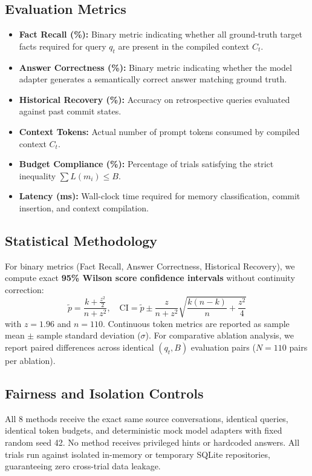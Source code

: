 \subsection{Evaluation Metrics}
\begin{itemize}
    \item \textbf{Fact Recall (\%):} Binary metric indicating whether all ground-truth target facts required for query $q_t$ are present in the compiled context $C_t$.
    \item \textbf{Answer Correctness (\%):} Binary metric indicating whether the model adapter generates a semantically correct answer matching ground truth.
    \item \textbf{Historical Recovery (\%):} Accuracy on retrospective queries evaluated against past commit states.
    \item \textbf{Context Tokens:} Actual number of prompt tokens consumed by compiled context $C_t$.
    \item \textbf{Budget Compliance (\%):} Percentage of trials satisfying the strict inequality $\sum L(m_i) \le B$.
    \item \textbf{Latency (ms):} Wall-clock time required for memory classification, commit insertion, and context compilation.
\end{itemize}

\subsection{Statistical Methodology}
For binary metrics (Fact Recall, Answer Correctness, Historical Recovery), we compute exact \textbf{95\% Wilson score confidence intervals} without continuity correction:
\begin{equation}
\tilde{p} = \frac{k + \frac{z^2}{2}}{n + z^2}, \quad \text{CI} = \tilde{p} \pm \frac{z}{n + z^2} \sqrt{\frac{k(n-k)}{n} + \frac{z^2}{4}}
\end{equation}
with $z = 1.96$ and $n = 110$. Continuous token metrics are reported as sample mean $\pm$ sample standard deviation ($\sigma$). For comparative ablation analysis, we report paired differences across identical $(q_t, B)$ evaluation pairs ($N = 110$ pairs per ablation).

\subsection{Fairness and Isolation Controls}
All 8 methods receive the exact same source conversations, identical queries, identical token budgets, and deterministic mock model adapters with fixed random seed 42. No method receives privileged hints or hardcoded answers. All trials run against isolated in-memory or temporary SQLite repositories, guaranteeing zero cross-trial data leakage.
